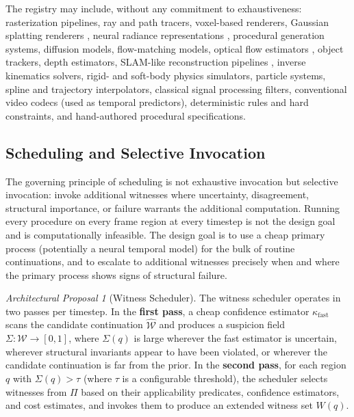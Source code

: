 \documentclass[11pt,a4paper]{article}
\theoremstyle{plain}
\theoremstyle{definition}
\theoremstyle{remark}
\newtheorem{proposal}[theorem]{Architectural Proposal}
\begin{document}
The registry may include, without any commitment to exhaustiveness: rasterization pipelines, ray and path tracers, voxel-based renderers, Gaussian splatting renderers \cite{kerbl2023gaussians}, neural radiance representations \cite{mildenhall2020nerf}, procedural generation systems, diffusion models, flow-matching models, optical flow estimators \cite{horn1981optical,lucas1981optical}, object trackers, depth estimators, SLAM-like reconstruction pipelines \cite{davison2007monoslam}, inverse kinematics solvers, rigid- and soft-body physics simulators, particle systems, spline and trajectory interpolators, classical signal processing filters, conventional video codecs (used as temporal predictors), deterministic rules and hard constraints, and hand-authored procedural specifications.

\subsection{Scheduling and Selective Invocation}

The governing principle of scheduling is not exhaustive invocation but selective invocation: invoke additional witnesses where uncertainty, disagreement, structural importance, or failure warrants the additional computation. Running every procedure on every frame region at every timestep is not the design goal and is computationally infeasible. The design goal is to use a cheap primary process (potentially a neural temporal model) for the bulk of routine continuations, and to escalate to additional witnesses precisely when and where the primary process shows signs of structural failure.

\begin{proposal}[Witness Scheduler]
The witness scheduler operates in two passes per timestep. In the \textbf{first pass}, a cheap confidence estimator $\kappa_{\text{fast}}$ scans the candidate continuation $\hat{\mathcal{W}}$ and produces a suspicion field $\Sigma : \mathcal{W} \to [0,1]$, where $\Sigma(q)$ is large wherever the fast estimator is uncertain, wherever structural invariants appear to have been violated, or wherever the candidate continuation is far from the prior. In the \textbf{second pass}, for each region $q$ with $\Sigma(q) > \tau$ (where $\tau$ is a configurable threshold), the scheduler selects witnesses from $\Pi$ based on their applicability predicates, confidence estimators, and cost estimates, and invokes them to produce an extended witness set $W(q)$.
\end{proposal}
\end{document}
